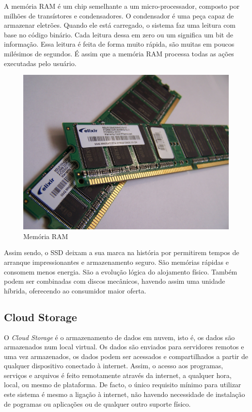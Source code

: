 \documentclass{report}
\begin{document}
\newpage	
	
	A memória RAM é um chip semelhante a um micro-processador, composto por milhões de transístores e condensadores. O condensador é uma peça capaz de armazenar eletrões. Quando ele está carregado, o sistema faz uma leitura com base no código binário. Cada leitura dessa em zero ou um significa um bit de informação. Essa leitura é feita de forma muito rápida, são muitas em poucos milésimos de segundos. É assim que a memória RAM processa todas as ações executadas pelo usuário.
\vspace{20mm}

	\begin{figure} [h]
		\centering
		\includegraphics[scale=0.09]{memram.jpg}
		\caption{Memória RAM}
	\end{figure}

\vspace{20mm}	
	
	Assim sendo, o SSD deixam a sua marca na história por permitirem tempos de arranque impressionantes e armazenamento seguro. São memórias rápidas e consomem menos energia. São a evolução lógica do alojamento físico. Também podem ser combinadas com discos mecânicos, havendo assim uma unidade híbrida, oferecendo ao consumidor maior oferta.

\newpage

		\subsection{Cloud Storage}
		
		O \textit{Cloud Storage} é o armazenamento de dados em nuvem, isto é,  os dados são armazenados num local virtual.  Os dados são enviados para servidores remotos e uma vez armazenados, os dados podem ser acessados e compartilhados a partir de qualquer dispositivo conectado à internet.
 Assim, o acesso aos programas, serviços e arquivos é feito remotamente através da internet, a qualquer hora, local, ou mesmo de plataforma. De facto, o único requisito mínimo para utilizar este sistema é mesmo a ligação à internet, não havendo necessidade de instalação de pogramas ou aplicações ou de qualquer outro suporte físico.
\vspace{1mm}
\end{document}
